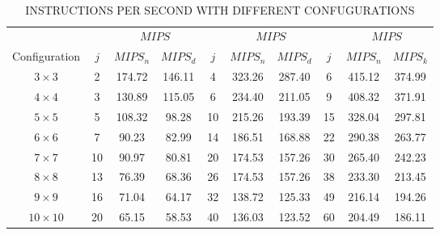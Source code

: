   \begin{table}[tbph]
 \centering
 \caption{INSTRUCTIONS PER SECOND WITH DIFFERENT CONFUGURATIONS }~\label{tab:time} 
 \begin{tabular}{|c|c|c|c|c|c|c|c|c|c|}
 \hline
 \hline
        &   & \multicolumn{2}{|c|}{ $MIPS$} &  & \multicolumn{2}{|c|}{$MIPS$} & & \multicolumn{2}{|c|}{$MIPS$}\\
Configuration	& $j$ & $ MIPS_n$ & $MIPS_d$ & $j$ & $MIPS_n$ & $MIPS_d$ &  $j$ &$ MIPS_n$ & $MIPS_k$ \\ 
 \hline 
 \hline
 $3 \times 3$ & 2 & 174.72 & 146.11 & 4 & 323.26 & 287.40 & 6 & 415.12 &374.99 \\
 $4 \times 4$ & 3 & 130.89 & 115.05 & 6 & 234.40 & 211.05 & 9 & 408.32 &371.91 \\
 $5 \times 5$ & 5 & 108.32 & 98.28 & 10 &215.26 & 193.39  & 15 & 328.04 &297.81 \\
 $6 \times 6$ & 7 & 90.23 & 82.99 & 14 &   186.51& 168.88  & 22 & 290.38 &263.77 \\
 $7 \times 7$ & 10 & 90.97 & 80.81 & 20 & 174.53 & 157.26 & 30 & 265.40 & 242.23 \\
 $8 \times 8$ & 13 & 76.39 & 68.36 & 26 & 174.53 & 157.26 & 38 & 233.30 &213.45 \\
 $9 \times 9$ & 16 & 71.04 & 64.17 & 32 & 138.72 & 125.33 & 49 & 216.14 &194.26 \\
 $10 \times 10$ & 20 & 65.15 & 58.53 & 40 & 136.03 & 123.52 & 60 & 204.49 &186.11 \\
 \hline
 \hline
 \end{tabular}
 \end{table}


